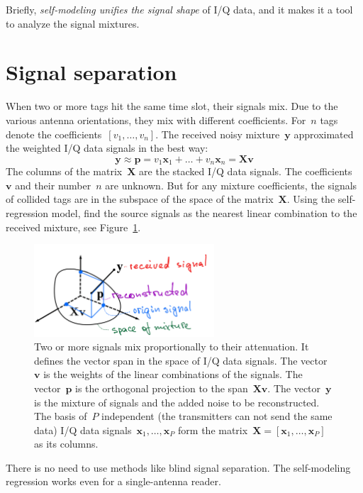 \documentclass[12pt]{article}
\newcommand{\bx}{\mathbf{x}}
\begin{document}
Briefly, \emph{self-modeling unifies the signal shape} of  I/Q data, and it makes it a tool to analyze the signal mixtures. 

\newcommand{\bX}{\mathbf{X}}
\newcommand{\bv}{\mathbf{v}}
\newcommand{\bp}{\mathbf{p}}
\newcommand{\by}{\mathbf{y}}
\newcommand{\beps}{\boldsymbol{\epsilon}}

\section{Signal separation}
When two or more tags hit the same time slot, their signals mix. Due to the various antenna orientations, they mix with different coefficients.  For~$n$ tags denote the coefficients~$[v_1, \dots, v_n]$. The received noisy mixture~$\mathbf{y}$ approximated the weighted I/Q data signals in the best way:
\[
\by \approx \mathbf{p} = v_1 \bx_1 + \dots + v_n \bx_n = \bX\bv
\] 
The columns of the matrix~$\mathbf{X}$ are the stacked I/Q data signals. 
The coefficients~$\bv$ and their number~$n$ are unknown. But for any mixture coefficients, the signals of collided tags are in the subspace of the space of the matrix~$\mathbf{X}$. Using the self-regression model, find the source signals as the nearest linear combination to the received mixture, see Figure~\ref{fig:lsq}. 
\begin{figure}[!t]
\centering
\includegraphics[width=0.6\textwidth]{fig_LSProj_hand}
\caption{Two or more signals mix proportionally to their attenuation. It defines the vector span in the space of I/Q data signals. The vector~$\mathbf{v}$ is the weights of the linear combinations of the signals. The vector~$\mathbf{p}$ is the orthogonal projection to the span~$\mathbf{X}\mathbf{v}$. The vector~$\mathbf{y}$ is the mixture of signals and the added noise to be reconstructed. The basis of~$P$ independent (the transmitters can not send the same data) I/Q data 
signals~$\mathbf{x}_1,\ldots,\mathbf{x}_P$ form the matrix~$\mathbf{X}=[\mathbf{x}_1,\ldots,\mathbf{x}_P]$ as its columns.}
\label{fig:lsq}
\end{figure}
There is no need to use methods like blind signal separation. The self-modeling regression works even for a single-antenna reader. 
\end{document}
